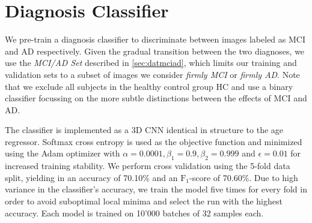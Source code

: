 \section{Diagnosis Classifier}
\label{sec:expdxclf}
We pre-train a diagnosis classifier to discriminate between images labeled as MCI and AD respectively. Given the gradual transition between the two diagnoses, we use the \textit{MCI/AD Set} described in \autoref{sec:datmciad}, which limits our training and validation sets to a subset of images we consider \textit{firmly MCI} or \textit{firmly AD}. Note that we exclude all subjects in the healthy control group HC and use a binary classifier focussing on the more subtle distinctions between the effects of MCI and AD.

The classifier is implemented as a 3D CNN identical in structure to the age regressor. Softmax cross entropy is used as the objective function and minimized using the Adam optimizer with $\alpha = 0.0001, \beta_1 = 0.9, \beta_2 = 0.999$ and $\epsilon = 0.01$ for increased training stability.
We perform cross validation using the 5-fold data split, yielding in an accuracy of 70.10\% and an $\text{F}_1$-score of 70.60\%. Due to high variance in the classifier's accuracy, we train the model five times for every fold in order to avoid suboptimal local minima and select the run with the highest accuracy. Each model is trained on 10'000 batches of 32 samples each.

